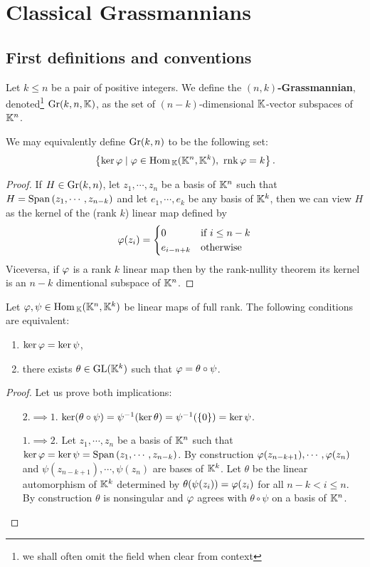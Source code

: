 \chapter{Classical Grassmannians}

\section{First definitions and conventions}
\begin{definition}[Grassmannian]
Let $k\leq n$ be a pair of positive integers. We define the \textbf{$(n,k)$-Grassmannian}, denoted\footnote{we shall often omit the field when clear from context} $\mathrm{Gr}(k,n,\mathbb{K})$, as the set of $(n-k)$-dimensional $\mathbb{K}$-vector subspaces of $\mathbb{K}^n$.
\end{definition}

\begin{remark}
We may equivalently define $\mathrm{Gr}(k,n)$ to be the following set:
\[\cpa{\ker \vp\mid \vp\in \Hom_\K(\K^n,\K^k),\ \rnk \vp=k}.\]
\end{remark}
\begin{proof}
If $H\in \mathrm{Gr}(k,n)$, let $z_1,\cdots, z_n$ be a basis of $\mathbb{K}^n$ such that $H=\mathrm{Span}\,(z_1,\cdots, z_{n-k})$ and let $e_1,\cdots, e_k$ be any basis of $\mathbb{K}^k$, then we can view $H$ as the kernel of the (rank $k$) linear map defined by
\[\varphi(z_i)=\begin{cases}
0 &\text{if }i\leq n-k\\
e_{i-n+k} &\text{otherwise}
\end{cases}\]
Viceversa, if $\varphi$ is a rank $k$ linear map then by the rank-nullity theorem its kernel is an $n-k$ dimentional subspace of $\mathbb{K}^n$.
\end{proof}

\begin{lemma}\label{kerAkerBVSActionOfGLk}
Let $\varphi,\psi\in \mathrm{Hom}\,_{\mathbb{K}}(\mathbb{K}^n,\mathbb{K}^k)$ be linear maps of full rank. The following conditions are equivalent:
\begin{enumerate}
    \item $\ker\varphi=\ker\psi$,
    \item there exists $\theta\in \mathrm{GL}(\mathbb{K}^k)$ such that $\varphi=\theta\circ \psi$. 
\end{enumerate}
\end{lemma}
\begin{proof}
Let us prove both implications:
\setlength{\leftmargini}{0cm}
\begin{itemize}
\item[$\boxed{2.\implies 1.}$] $\ker(\theta\circ \psi)=\psi^{-1}(\ker \theta)=\psi^{-1}(\left\{{0}\right\})=\ker \psi$. 
\item[$\boxed{1.\implies 2.}$] Let $z_1,\cdots, z_n$ be a basis of $\mathbb{K}^n$ such that $\ker\varphi=\ker\psi=\mathrm{Span}\,(z_1,\cdots, z_{n-k})$. By construction $\varphi(z_{n-k+1}),\cdots, \varphi(z_n)$ and $\psi(z_{n-k+1}),\cdots, \psi(z_n)$ are bases of $\mathbb{K}^k$. Let $\theta$ be the linear automorphism of $\mathbb{K}^k$ determined by $\theta(\psi(z_i))=\varphi(z_i)$ for all $n-k<i\leq n$. By construction $\theta$ is nonsingular and $\varphi$ agrees with $\theta\circ \psi$ on a basis of $\mathbb{K}^n$.
\end{itemize}
\setlength{\leftmargini}{0.5cm}
\end{proof}

